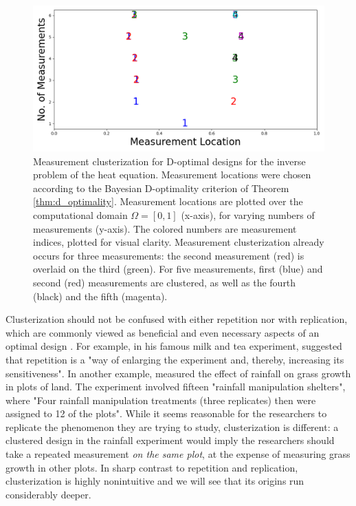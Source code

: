 \documentclass[ba]{imsart}
\theoremstyle{plain}
\theoremstyle{definition}
\theoremstyle{remark}
\begin{document}
\begin{figure}
    \centering
    \includegraphics[height=0.5\textwidth]{figs/dst_modelError0.png}
    \caption{Measurement clusterization for D-optimal designs for the
      inverse problem of the heat equation. Measurement locations were
      chosen according to the Bayesian D-optimality criterion of
      Theorem \ref{thm:d_optimality}. Measurement locations are
      plotted over the computational domain \(\Omega = [0, 1]\)
      (x-axis), for varying numbers of measurements (y-axis). The
      colored numbers are measurement indices, plotted for visual
      clarity. Measurement clusterization already occurs for three
      measurements: the second measurement (red) is overlaid on the
      third (green). For five measurements, first (blue) and second
      (red) measurements are clustered, as well as the fourth (black)
      and the fifth (magenta).}
  \label{fig:clusterization_illustration}
\end{figure}


Clusterization should not be confused with either repetition nor with
replication, which are commonly viewed as beneficial and even
necessary aspects of an optimal design \cite{fisher1949design,
  morris2011, schafer2001replication}. For example,
\cite{fisher1949design} in his famous milk and tea experiment,
suggested that repetition is a "way of enlarging the experiment and,
thereby, increasing its sensitiveness". In another example,
\cite{fay2000rainfall} measured the effect of rainfall on grass growth
in plots of land. The experiment involved fifteen "rainfall
manipulation shelters", where "Four rainfall manipulation treatments
(three replicates) then were assigned to 12 of the plots". While it
seems reasonable for the researchers to replicate the phenomenon they
are trying to study, clusterization is different: a clustered design
in the rainfall experiment would imply the researchers should take a
repeated measurement \emph{on the same plot}, at the expense of
measuring grass growth in other plots. In sharp contrast to repetition
and replication, clusterization is highly nonintuitive and we will see
that its origins run considerably deeper.
\end{document}
